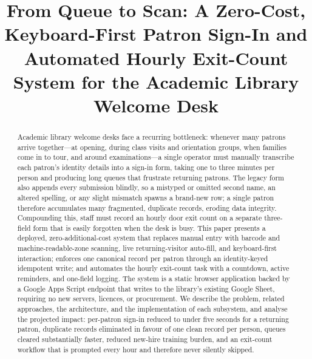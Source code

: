 \documentclass[conference]{IEEEtran}
\begin{document}
\title{From Queue to Scan: A Zero-Cost, Keyboard-First Patron Sign-In and Automated Hourly Exit-Count System for the Academic Library Welcome Desk}

\author{
}

\maketitle

\begin{abstract}
Academic library welcome desks face a recurring bottleneck: whenever many patrons arrive together---at opening, during class visits and orientation groups, when families come in to tour, and around examinations---a single operator must manually transcribe each patron's identity details into a sign-in form, taking one to three minutes per person and producing long queues that frustrate returning patrons. The legacy form also appends every submission blindly, so a mistyped or omitted second name, an altered spelling, or any slight mismatch spawns a brand-new row; a single patron therefore accumulates many fragmented, duplicate records, eroding data integrity. Compounding this, staff must record an hourly door exit count on a separate three-field form that is easily forgotten when the desk is busy. This paper presents a deployed, zero-additional-cost system that replaces manual entry with barcode and machine-readable-zone scanning, live returning-visitor auto-fill, and keyboard-first interaction; enforces one canonical record per patron through an identity-keyed idempotent write; and automates the hourly exit-count task with a countdown, active reminders, and one-field logging. The system is a static browser application backed by a Google Apps Script endpoint that writes to the library's existing Google Sheet, requiring no new servers, licences, or procurement. We describe the problem, related approaches, the architecture, and the implementation of each subsystem, and analyse the projected impact: per-patron sign-in reduced to under five seconds for a returning patron, duplicate records eliminated in favour of one clean record per person, queues cleared substantially faster, reduced new-hire training burden, and an exit-count workflow that is prompted every hour and therefore never silently skipped.
\end{abstract}
\end{document}
